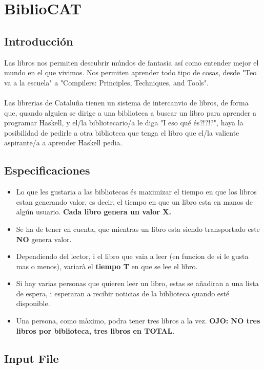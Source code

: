 \documentclass{article}
\begin{document}
\section{BiblioCAT}
\subsection{Introducción}
Las libros nos permiten descubrir múndos de fantasia así como entender mejor el mundo en el que vivimos. Nos permiten aprender todo tipo de cosas, desde "Teo va a la escuela" a "Compilers: Principles, Techniques, and Tools".\\\\
%
Las librerias de Cataluña tienen un sistema de intercanvio de libros, de forma que, quando alguien se dirige a una biblioteca a buscar un libro para aprender a programar Haskell, y el/la bibliotecario/a le diga "I eso qué és?!?!?", haya la posibilidad de pedirle a otra biblioteca que tenga el libro que el/la valiente aspirante/a a aprender Haskell pedia.
%
\subsection{Especificaciones}
\begin{itemize}
\item Lo que les gustaria a las bibliotecas és maximizar el tiempo en que los libros estan generando valor, es decir, el tiempo en que un libro esta en manos de algún usuario. \textbf{Cada libro genera un valor X.} 

\item Se ha de tener en cuenta, que mientras un libro esta siendo transportado este \textbf{NO} genera valor. 

\item Dependiendo del lector, i el libro que vaia a leer (en funcion de si le gusta mas o menos), variarà el \textbf{tiempo T} en que se lee el libro.

\item Si hay varias personas que quieren leer un libro, estas se añadiran a una lista de espera, i esperaran a recibir noticias de la biblioteca quando esté disponible.

\item Una persona, como màximo, podra tener tres libros a la vez. \textbf{OJO: NO tres libros por biblioteca, tres libros en TOTAL}. 
\end{itemize}
\subsection{Input File}
\end{document}
